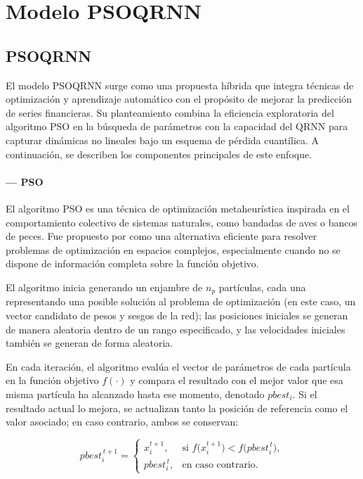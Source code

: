 \documentclass[12pt]{paper}
\begin{document}
\section{Modelo PSOQRNN}
\label{sec:modelo-psoqrnn}

\subsection[PSOQRNN]{PSOQRNN}

El modelo PSOQRNN surge como una propuesta híbrida que integra técnicas de optimización y aprendizaje automático con el propósito de mejorar la predicción de series financieras. Su planteamiento combina la eficiencia exploratoria del algoritmo PSO \citep{kennedy1995} en la búsqueda de parámetros con la capacidad del QRNN \citep{taylor2000qrnn} para capturar dinámicas no lineales bajo un esquema de pérdida cuantílica. A continuación, se describen los componentes principales de este enfoque.

\paragraph{--- PSO}
El algoritmo PSO es una técnica de optimización metaheurística inspirada en el comportamiento colectivo de sistemas naturales, como bandadas de aves o bancos de peces. Fue propuesto por \cite{kennedy1995} como una alternativa eficiente para resolver problemas de optimización en espacios complejos, especialmente cuando no se dispone de información completa sobre la función objetivo.

El algoritmo inicia generando un enjambre de $n_p$ partículas, cada una representando una posible solución al problema de optimización (en este caso, un vector candidato de pesos y sesgos de la red); las posiciones iniciales se generan de manera aleatoria dentro de un rango especificado, y las velocidades iniciales también se generan de forma aleatoria.

En cada iteración, el algoritmo evalúa el vector de parámetros de cada partícula en la función objetivo $f(\cdot)$ y compara el resultado con el mejor valor que esa misma partícula ha alcanzado hasta ese momento, denotado $pbest_i$. Si el resultado actual lo mejora, se actualizan tanto la posición de referencia como el valor asociado; en caso contrario, ambos se conservan:

\begin{equation}
pbest_i^{\,t+1} =
\begin{cases}
x_i^{t+1}, & \text{si } f\bigl(x_i^{t+1}\bigr) < f\bigl(pbest_i^{\,t}\bigr),\\[4pt]
pbest_i^{\,t}, & \text{en caso contrario.}
\end{cases}
\end{equation}
\end{document}
